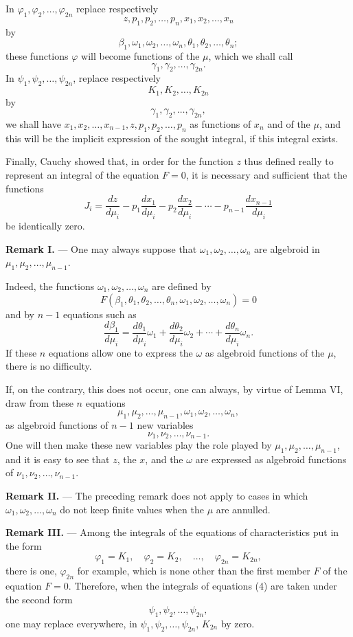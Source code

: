 \documentclass[11pt]{article}
\begin{document}
In $\varphi_1,\varphi_2,\ldots,\varphi_{2n}$ replace respectively
\[
z,p_1,p_2,\ldots,p_n,x_1,x_2,\ldots,x_n
\]
by
\[
\beta_1,\omega_1,\omega_2,\ldots,\omega_n,\theta_1,\theta_2,\ldots,\theta_n;
\]
these functions $\varphi$ will become functions of the $\mu$, which we shall call
\[
\gamma_1,\gamma_2,\ldots,\gamma_{2n}.
\]
In $\psi_1,\psi_2,\ldots,\psi_{2n}$, replace respectively
\[
K_1,K_2,\ldots,K_{2n}
\]
by
\[
\gamma_1,\gamma_2,\ldots,\gamma_{2n},
\]
we shall have $x_1,x_2,\ldots,x_{n-1},z,p_1,p_2,\ldots,p_n$ as functions of $x_n$ and of the $\mu$, and this will be the implicit expression of the sought integral, if this integral exists.

Finally, Cauchy showed that, in order for the function $z$ thus defined really to represent an integral of the equation $F=0$, it is necessary and sufficient that the functions
\[
J_i=\frac{dz}{d\mu_i}-p_1\frac{dx_1}{d\mu_i}-p_2\frac{dx_2}{d\mu_i}-\cdots-p_{n-1}\frac{dx_{n-1}}{d\mu_i}
\]
be identically zero.

\medskip
\noindent\textbf{Remark I.} — One may always suppose that $\omega_1,\omega_2,\ldots,\omega_n$ are algebroid in $\mu_1,\mu_2,\ldots,\mu_{n-1}$.

Indeed, the functions $\omega_1,\omega_2,\ldots,\omega_n$ are defined by
\[
F(\beta_1,\theta_1,\theta_2,\ldots,\theta_n,\omega_1,\omega_2,\ldots,\omega_n)=0
\]
and by $n-1$ equations such as
\[
\frac{d\beta_1}{d\mu_i}=\frac{d\theta_1}{d\mu_i}\omega_1+\frac{d\theta_2}{d\mu_i}\omega_2+\cdots+\frac{d\theta_n}{d\mu_i}\omega_n.
\]
If these $n$ equations allow one to express the $\omega$ as algebroid functions of the $\mu$, there is no difficulty.

If, on the contrary, this does not occur, one can always, by virtue of Lemma VI, draw from these $n$ equations
\[
\mu_1,\mu_2,\ldots,\mu_{n-1},\omega_1,\omega_2,\ldots,\omega_n,
\]
as algebroid functions of $n-1$ new variables
\[
\nu_1,\nu_2,\ldots,\nu_{n-1}.
\]
One will then make these new variables play the role played by $\mu_1,\mu_2,\ldots,\mu_{n-1}$, and it is easy to see that $z$, the $x$, and the $\omega$ are expressed as algebroid functions of $\nu_1,\nu_2,\ldots,\nu_{n-1}$.

\medskip
\noindent\textbf{Remark II.} — The preceding remark does not apply to cases in which $\omega_1,\omega_2,\ldots,\omega_n$ do not keep finite values when the $\mu$ are annulled.

\medskip
\noindent\textbf{Remark III.} — Among the integrals of the equations of characteristics put in the form
\begin{equation*}\tag{5}
\varphi_1=K_1,
\quad \varphi_2=K_2,
\quad \ldots,
\quad \varphi_{2n}=K_{2n},
\end{equation*}
there is one, $\varphi_{2n}$ for example, which is none other than the first member $F$ of the equation $F=0$. Therefore, when the integrals of equations (4) are taken under the second form
\[
\psi_1,\psi_2,\ldots,\psi_{2n},
\]
one may replace everywhere, in $\psi_1,\psi_2,\ldots,\psi_{2n}$, $K_{2n}$ by zero.
\end{document}
